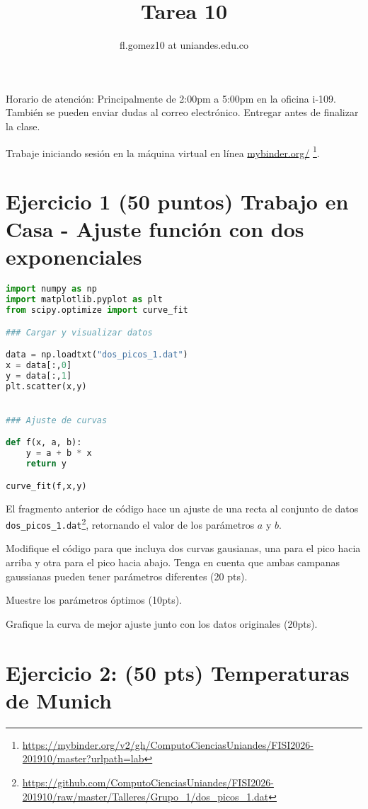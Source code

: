 \documentclass{article}
\title{Tarea 10}
\author{fl.gomez10 at uniandes.edu.co}
\begin{document}
\maketitle

Horario de atención: Principalmente de 2:00pm a 5:00pm en la oficina i-109.
También se pueden enviar dudas al correo electrónico.
Entregar antes de finalizar la clase. 

Trabaje iniciando  sesión en la máquina virtual en línea
\href{https://mybinder.org/v2/gh/ComputoCienciasUniandes/FISI2026-201910/master?urlpath=lab}{mybinder.org/}
\footnote{\url{https://mybinder.org/v2/gh/ComputoCienciasUniandes/FISI2026-201910/master?urlpath=lab}}. 


\section{Ejercicio 1 (50 puntos) Trabajo en Casa - Ajuste función con dos exponenciales}

\begin{lstlisting}[language=Python]
import numpy as np
import matplotlib.pyplot as plt
from scipy.optimize import curve_fit

### Cargar y visualizar datos

data = np.loadtxt("dos_picos_1.dat")
x = data[:,0]
y = data[:,1]
plt.scatter(x,y)


### Ajuste de curvas

def f(x, a, b):
    y = a + b * x
    return y

curve_fit(f,x,y)
\end{lstlisting}

El fragmento anterior de código hace un ajuste de una recta al conjunto de datos
\texttt{dos\_picos\_1.dat}\footnote{\url{https://github.com/ComputoCienciasUniandes/FISI2026-201910/raw/master/Talleres/Grupo_1/dos_picos_1.dat}}, retornando el valor de los parámetros $a$ y $b$.

Modifique el código para que incluya dos curvas gausianas, una
para el pico hacia arriba y otra para el pico hacia abajo.
Tenga en cuenta que ambas campanas gaussianas pueden tener
parámetros diferentes (20 pts).

Muestre los parámetros óptimos (10pts).

Grafique la curva de mejor ajuste junto con los datos originales (20pts).

\section{Ejercicio 2: (50 pts) Temperaturas de Munich}
\end{document}

